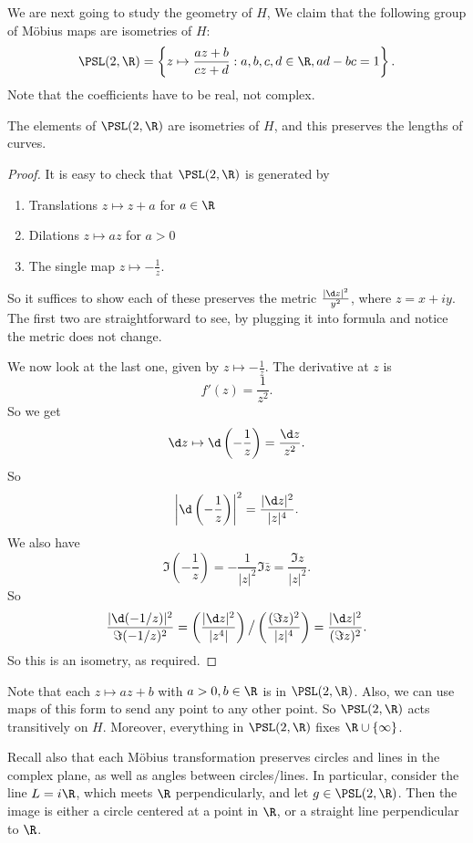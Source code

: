 \documentclass[a4paper]{article}
\begin{document}
We are next going to study the geometry of $H$, We claim that the following group of M\"obius maps are isometries of $H$:
\[
  \PSL(2, \R) = \left\{z \mapsto \frac{az + b}{cz + d}: a, b, c, d \in \R, ad - bc = 1\right\}.
\]
Note that the coefficients have to be real, not complex.
\begin{prop}
  The elements of $\PSL(2, \R)$ are isometries of $H$, and this preserves the lengths of curves.
\end{prop}

\begin{proof}
  It is easy to check that $\PSL(2, \R)$ is generated by
  \begin{enumerate}
    \item Translations $z \mapsto z + a$ for $a \in \R$
    \item Dilations $z \mapsto az$ for $a > 0$
    \item The single map $z \mapsto -\frac{1}{z}$.
  \end{enumerate}
  So it suffices to show each of these preserves the metric $\frac{|\d z|^2}{y^2}$, where $z = x + iy$. The first two are straightforward to see, by plugging it into formula and notice the metric does not change.

  We now look at the last one, given by $z \mapsto -\frac{1}{z}$. The derivative at $z$ is
  \[
    f'(z) = \frac{1}{z^2}.
  \]
  So we get
  \[
    \d z \mapsto \d\left(-\frac{1}{z}\right) = \frac{\d z}{z^2}.
  \]
  So
  \[
    \left|\d\left(-\frac{1}{z}\right)\right|^2 = \frac{|\d z|^2}{|z|^4}.
  \]
  We also have
  \[
    \Im\left(-\frac{1}{z}\right) = -\frac{1}{|z|^2} \Im\bar{z} = \frac{\Im z}{|z|^2}.
  \]
  So
  \[
    \frac{|\d(-1/z)|^2}{\Im(-1/z)^2} = \left(\frac{|\d z|^2}{|z^4|}\right)\big/ \left(\frac{(\Im z)^2}{|z|^4}\right) = \frac{|\d z|^2}{(\Im z)^2}.
  \]
  So this is an isometry, as required.
\end{proof}

Note that each $z \mapsto az + b$ with $a > 0, b \in \R$ is in $\PSL(2, \R)$. Also, we can use maps of this form to send any point to any other point. So $\PSL(2, \R)$ acts transitively on $H$. Moreover, everything in $\PSL(2, \R)$ fixes $\R \cup \{\infty\}$.

Recall also that each M\"obius transformation preserves circles and lines in the complex plane, as well as angles between circles/lines. In particular, consider the line $L = i\R$, which meets $\R$ perpendicularly, and let $g \in \PSL(2, \R)$. Then the image is either a circle centered at a point in $\R$, or a straight line perpendicular to $\R$.
\end{document}
